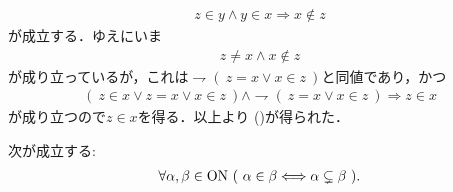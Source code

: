 \begin{prf}
\begin{align}
					z \in y \wedge y \in x \Longrightarrow x \notin z
				\end{align}
				が成立する．ゆえにいま
				\begin{align}
					z \neq x \wedge x \notin z
				\end{align}
				が成り立っているが，これは$\rightharpoondown (\ z = x \vee x \in z\ )$と同値であり，かつ
				\begin{align}
					(\ z \in x \vee z = x \vee x \in z\ ) \wedge 
					\rightharpoondown (\ z = x \vee x \in z\ )
					\Longrightarrow z \in x
				\end{align}
				が成り立つので$z \in x$を得る．以上より
				()が得られた．
				\QED
	\end{prf}
	
	\begin{screen}
		\begin{thm}
		\label{thm:element_and_proper_subset_correspond_between_ordinal_numbers}
			次が成立する:
			\begin{align}
				\forall \alpha,\beta \in \ON\ 
				(\ \alpha \in \beta \Longleftrightarrow \alpha \subsetneq \beta\ ).
			\end{align}
		\end{thm}
	\end{screen}
	
